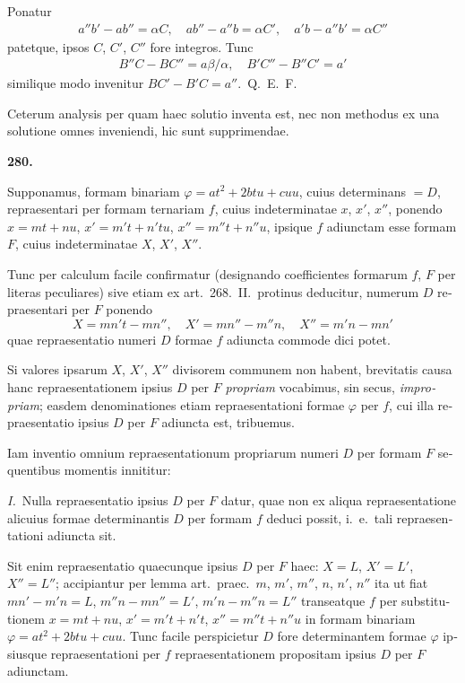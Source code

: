 \documentclass[12pt,a4paper]{article}
\theoremstyle{plain}
\theoremstyle{definition}
\theoremstyle{remark}
\begin{document}
\begin{otherlanguage}{latin}
Ponatur
\begin{gather*}
a''b' - ab'' = \alpha C, \quad ab'' - a''b = \alpha C', \quad a'b - a''b' = \alpha C''
\end{gather*}
patetque, ipsos $C$, $C'$, $C''$ fore integros. Tunc
\begin{gather*}
B''C - BC'' = a\beta/\alpha, \quad B'C'' - B''C' = a'
\end{gather*}
similique modo invenitur $BC' - B'C = a''$.~\hfill Q.\ E.\ F.

Ceterum analysis per quam haec solutio inventa est, nec non methodus ex una solutione omnes inveniendi, hic sunt supprimendae.

\bigskip

\textbf{280.}

Supponamus, formam binariam $\varphi = at^2 + 2btu + cuu$, cuius determinans $= D$, repraesentari per formam ternariam $f$, cuius indeterminatae $x$, $x'$, $x''$, ponendo $x = mt + nu$, $x' = m't + n't u$, $x'' = m''t + n''u$, ipsique $f$ adiunctam esse formam $F$, cuius indeterminatae $X$, $X'$, $X''$.

Tunc per calculum facile confirmatur (designando coefficientes formarum $f$, $F$ per literas peculiares) sive etiam ex art.\ 268.\ II.\ protinus deducitur, numerum $D$ repraesentari per $F$ ponendo
\[
X = mn't - mn'', \quad X' = mn'' - m''n, \quad X'' = m'n - mn'
\]
quae repraesentatio numeri $D$ formae $f$ adiuncta commode dici potet.

Si valores ipsarum $X$, $X'$, $X''$ divisorem communem non habent, brevitatis causa hanc repraesentationem ipsius $D$ per $F$ \emph{propriam} vocabimus, sin secus, \emph{impropriam}; easdem denominationes etiam repraesentationi formae $\varphi$ per $f$, cui illa repraesentatio ipsius $D$ per $F$ adiuncta est, tribuemus.

Iam inventio omnium repraesentationum propriarum numeri $D$ per formam $F$ sequentibus momentis innititur:

\textit{I.}\ Nulla repraesentatio ipsius $D$ per $F$ datur, quae non ex aliqua repraesentatione alicuius formae determinantis $D$ per formam $f$ deduci possit, i.\ e.\ tali repraesentationi adiuncta sit.

Sit enim repraesentatio quaecunque ipsius $D$ per $F$ haec: $X = L$, $X' = L'$, $X'' = L''$; accipiantur per lemma art.\ praec.\ $m$, $m'$, $m''$, $n$, $n'$, $n''$ ita ut fiat $mn' - m'n = L$, $m''n - mn'' = L'$, $m'n - m''n = L''$ transeatque $f$ per substitutionem $x = mt + nu$, $x' = m't + n't$, $x'' = m''t + n''u$ in formam binariam $\varphi = at^2 + 2btu + cuu$. Tunc facile perspicietur $D$ fore determinantem formae $\varphi$ ipsiusque repraesentationi per $f$ repraesentationem propositam ipsius $D$ per $F$ adiunctam.


\end{otherlanguage}
\end{document}
